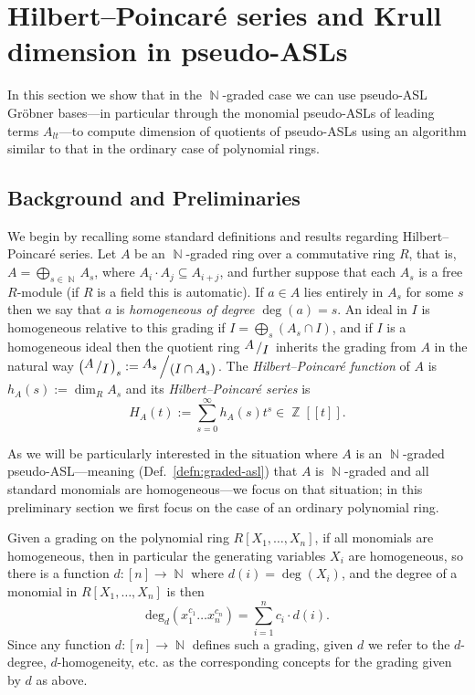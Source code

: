 \documentclass[11pt,reqno]{amsart}
\DeclareMathOperator{\Z}{\mathbb{Z}}
\DeclareMathOperator{\N}{\mathbb{N}}
\newcommand{\bigslant}[2]{{\raisebox{.2em}{$#1$}\left/\raisebox{-.2em}{$#2$}\right.}}
\theoremstyle{definition}
\numberwithin{equation}{section}
\begin{document}

\section{Hilbert--Poincar\'e series and Krull dimension in pseudo-ASLs}
\label{sec:dimension}

In this section we show that in the $\N$-graded case we can use pseudo-ASL Gröbner bases---in particular through the monomial pseudo-ASLs of leading terms $A_{lt}$---to compute dimension of quotients of pseudo-ASLs using an algorithm similar to that in the ordinary case of polynomial rings.

\subsection{Background and Preliminaries}
\label{sec:hilbert-background}
We begin by recalling some standard definitions and results regarding Hilbert--Poincar\'e series. Let $A$ be an $\N$-graded ring over a commutative ring $R$, that is, $A = \bigoplus_{s \in \N} A_s$, where $A_i \cdot A_j \subseteq A_{i+j}$, and further suppose that each $A_s$ is a free $R$-module (if $R$ is a field this is automatic). If $a \in A$ lies entirely in $A_s$ for some $s$ then we say that $a$ is \emph{homogeneous of degree $\deg(a)=s$}. An ideal in $I$ is homogeneous relative to this grading if $I = \bigoplus_s (A_s \cap I)$, and if $I$ is a homogeneous ideal then the quotient ring $\bigslant{A}{I}$ inherits the grading from $A$ in the natural way $\left(\bigslant{A}{I}\right)_s := \bigslant{A_s}{(I \cap A_s)}$. The \emph{Hilbert--Poincar\'e function} of $A$ is $h_A(s) := \dim_R A_s$ and its \emph{Hilbert--Poincar\'e series} is
\[
H_A(t) := \sum_{s=0}^{\infty} h_A(s) t^s \in \Z[\![t]\!].
\]

As we will be particularly interested in the situation where $A$ is an $\N$-graded pseudo-ASL---meaning (Def.~\ref{defn:graded-asl}) that $A$ is $\N$-graded and all standard monomials are homogeneous---we focus on that situation; in this preliminary section we first focus on the case of an ordinary polynomial ring. 

Given a grading on the polynomial ring $R[X_1,\dotsc,X_n]$, if all monomials are homogeneous, then in particular the generating variables $X_i$ are homogeneous, so there is a function $d\colon [n] \to \N$ where $d(i) = \deg(X_i)$, and the degree of a monomial in $R[X_1,\dotsc,X_n]$ is then 
\[
\mathrm{deg}_d(x_1^{c_1}\ldots x_n^{c_n}) = \sum_{i=1}^n c_i \cdot d(i).
\] 
Since any function $d \colon [n] \to \N$ defines such a grading, given $d$ we refer to the $d$-degree, $d$-homogeneity, etc. as the corresponding concepts for the grading given by $d$ as above.
\end{document}
